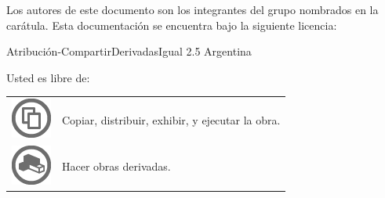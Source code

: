 \thispagestyle{empty}

\noindent\footnotesize Los autores de este documento son los integrantes del
grupo nombrados en la carátula. Esta documentación se encuentra bajo la
siguiente licencia:

\begin{center}
\LARGE{Atribución-CompartirDerivadasIgual 2.5}\linebreak
\LARGE{Argentina}
\end{center}

\noindent Usted es libre de:\newline
\begin{tabular}[t]{rl}
\multirow{5}{*}{\includegraphics{licencia/share.jpg}} &
\multirow{5}{*}{\parbox{300pt}{Copiar, distribuir, exhibir, y ejecutar la
obra.}} \\ \\ \\ \\ \\
\multirow{5}{*}{\includegraphics{licencia/remix.jpg}} &
\multirow{5}{*}{\parbox{300pt}{Hacer obras derivadas.}} \\ \\ \\ \\
\end{tabular}\newline\newline

